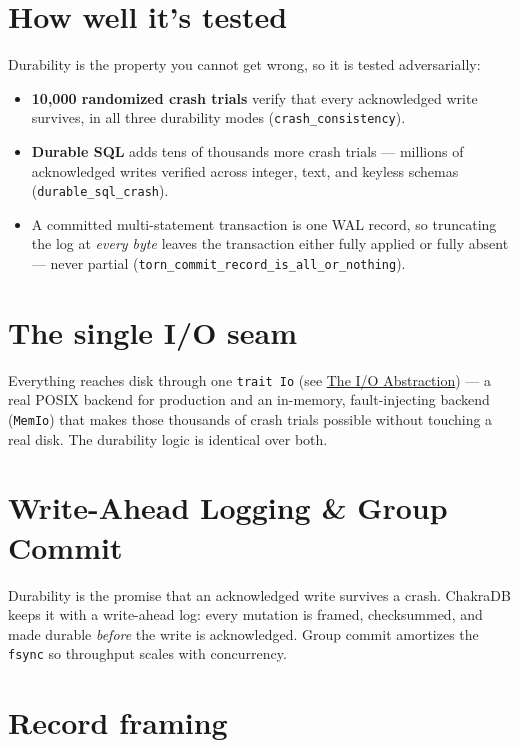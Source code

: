 \documentclass[
  11pt,
  openany]{book}
\providecommand{\tightlist}{%
  \setlength{\itemsep}{0pt}\setlength{\parskip}{0pt}}
\begin{document}
\section{How well it's tested}\label{how-well-its-tested}

Durability is the property you cannot get wrong, so it is tested
adversarially:

\begin{itemize}
\tightlist
\item
  \textbf{10,000 randomized crash trials} verify that every acknowledged
  write survives, in all three durability modes
  (\texttt{crash\_consistency}).
\item
  \textbf{Durable SQL} adds tens of thousands more crash trials ---
  millions of acknowledged writes verified across integer, text, and
  keyless schemas (\texttt{durable\_sql\_crash}).
\item
  A committed multi-statement transaction is one WAL record, so
  truncating the log at \emph{every byte} leaves the transaction either
  fully applied or fully absent --- never partial
  (\texttt{torn\_commit\_record\_is\_all\_or\_nothing}).
\end{itemize}

\section{The single I/O seam}\label{the-single-io-seam}

Everything reaches disk through one \texttt{trait\ Io} (see
\href{storage.md}{The I/O Abstraction}) --- a real POSIX backend for
production and an in-memory, fault-injecting backend (\texttt{MemIo})
that makes those thousands of crash trials possible without touching a
real disk. The durability logic is identical over both.

\section{Write-Ahead Logging \& Group
Commit}\label{write-ahead-logging-group-commit}

Durability is the promise that an acknowledged write survives a crash.
ChakraDB keeps it with a write-ahead log: every mutation is framed,
checksummed, and made durable \emph{before} the write is acknowledged.
Group commit amortizes the \texttt{fsync} so throughput scales with
concurrency.

\section{Record framing}\label{record-framing}
\end{document}
